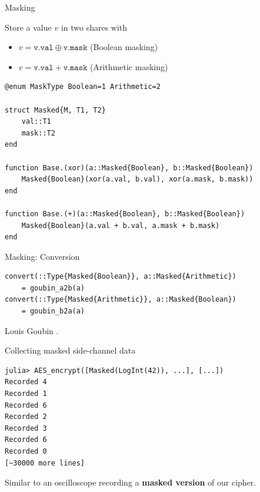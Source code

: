 \begin{frame}[fragile]{Masking}

Store a value $v$ in two shares with
\begin{itemize}
    \item $v = \mathtt{v.val} \oplus \mathtt{v.mask}$ \hspace{1em} ({Boolean masking})
    \item $v = \mathtt{v.val} + \mathtt{v.mask}$ \hspace{1em} ({Arithmetic masking})
\end{itemize}

\vspace{1em}

\begin{verbatim}
@enum MaskType Boolean=1 Arithmetic=2

struct Masked{M, T1, T2}
    val::T1
    mask::T2
end

function Base.(xor)(a::Masked{Boolean}, b::Masked{Boolean})
    Masked{Boolean}(xor(a.val, b.val), xor(a.mask, b.mask))
end

function Base.(+)(a::Masked{Boolean}, b::Masked{Boolean})
    Masked{Boolean}(a.val + b.val, a.mask + b.mask)
end

\end{verbatim}
\end{frame}

\begin{frame}[fragile]{Masking: Conversion}

\begin{verbatim}
convert(::Type{Masked{Boolean}}, a::Masked{Arithmetic})
    = goubin_a2b(a)
convert(::Type{Masked{Arithmetic}}, a::Masked{Boolean})
    = goubin_b2a(a)
\end{verbatim}

\begin{thebibliography}{10}
    \beamertemplatebookbibitems
    Louis Goubin
    .
\end{thebibliography}
\end{frame}



\begin{frame}[fragile]{Collecting masked side-channel data}

    \begin{verbatim}
julia> AES_encrypt([Masked(LogInt(42)), ...], [...])
Recorded 4
Recorded 1
Recorded 6
Recorded 2
Recorded 3
Recorded 6
Recorded 0
[~30000 more lines]
        \end{verbatim}
\vspace{1em}
Similar to an oscilloscope recording a \textbf{masked version} of our cipher.
\end{frame}

